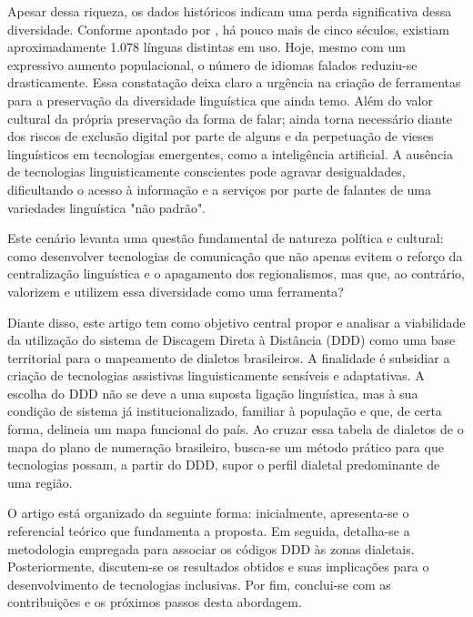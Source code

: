 \begin{flushleft}
Apesar dessa riqueza, os dados históricos indicam uma perda significativa dessa diversidade. Conforme apontado por \cite{rodrigues_linguas_nodate}, há pouco mais de cinco séculos, existiam aproximadamente 1.078 línguas distintas em uso. Hoje, mesmo com um expressivo aumento populacional, o número de idiomas falados reduziu-se drasticamente. Essa constatação deixa claro a urgência na criação de ferramentas para a preservação da diversidade linguística que ainda temo. Além do valor cultural da própria preservação da forma de falar; ainda torna necessário diante dos riscos de exclusão digital por parte de alguns e da perpetuação de vieses linguísticos em tecnologias emergentes, como a inteligência artificial. A ausência de tecnologias linguisticamente conscientes pode agravar desigualdades, dificultando o acesso à informação e a serviços por parte de falantes de uma variedades linguística "não padrão".

Este cenário levanta uma questão fundamental de natureza política e cultural: como desenvolver tecnologias de comunicação que não apenas evitem o reforço da centralização linguística e o apagamento dos regionalismos, mas que, ao contrário, valorizem e utilizem essa diversidade como uma ferramenta?

Diante disso, este artigo tem como objetivo central propor e analisar a viabilidade da utilização do sistema de Discagem Direta à Distância (DDD) como uma base territorial para o mapeamento de dialetos brasileiros. A finalidade é subsidiar a criação de tecnologias assistivas linguisticamente sensíveis e adaptativas. A escolha do DDD não se deve a uma suposta ligação linguística, mas à sua condição de sistema já institucionalizado, familiar à população e que, de certa forma, delineia um mapa funcional do país. Ao cruzar essa tabela de dialetos de o mapa do plano de numeração brasileiro, busca-se um método prático para que tecnologias possam, a partir do DDD, supor o perfil dialetal predominante de uma região.

O artigo está organizado da seguinte forma: inicialmente, apresenta-se o referencial teórico que fundamenta a proposta. Em seguida, detalha-se a metodologia empregada para associar os códigos DDD às zonas dialetais. Posteriormente, discutem-se os resultados obtidos e suas implicações para o desenvolvimento de tecnologias inclusivas. Por fim, conclui-se com as contribuições e os próximos passos desta abordagem.



\end{flushleft}


